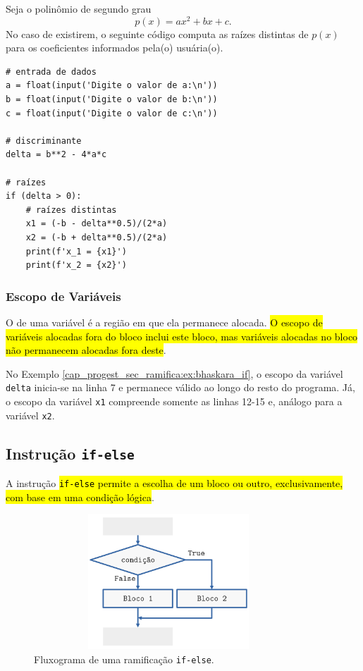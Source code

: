\begin{ex}\label{cap_progest_sec_ramifica:ex:bhaskara_if}
  Seja o polinômio de segundo grau
  \begin{equation}
    p(x) = ax^2 + bx + c.
  \end{equation}
  No caso de existirem, o seguinte código computa as raízes distintas de $p(x)$ para os coeficientes informados pela(o) usuária(o).

\begin{lstlisting}
# entrada de dados
a = float(input('Digite o valor de a:\n'))
b = float(input('Digite o valor de b:\n'))
c = float(input('Digite o valor de c:\n'))

# discriminante
delta = b**2 - 4*a*c

# raízes
if (delta > 0):
    # raízes distintas
    x1 = (-b - delta**0.5)/(2*a)
    x2 = (-b + delta**0.5)/(2*a)
    print(f'x_1 = {x1}')
    print(f'x_2 = {x2}')
\end{lstlisting}

\end{ex}

\subsubsection{Escopo de Variáveis}

O  de uma variável é a região em que ela permanece alocada. \hl{O escopo de variáveis alocadas fora do bloco {\PYTHONif} inclui este bloco, mas variáveis alocadas no bloco {\PYTHONif} não permanecem alocadas fora deste}.

\begin{ex}
  No Exemplo \ref{cap_progest_sec_ramifica:ex:bhaskara_if}, o escopo da variável \lstinline+delta+ inicia-se na linha 7 e permanece válido ao longo do resto do programa. Já, o escopo da variável \lstinline+x1+ compreende somente as linhas 12-15 e, análogo para a variável \lstinline+x2+. 
\end{ex}

\subsection{Instrução \texttt{if-else}}

A instrução \hl{\texttt{if-else} permite a escolha de um bloco ou outro, exclusivamente, com base em uma condição lógica}.

\begin{figure}[H]
  \centering
  \includegraphics[max width=0.9\textwidth, max height=2in]{./cap_progest/dados/fig_fg_else/fig.png}
  \caption{Fluxograma de uma ramificação \lstinline+if-else+.}
  \label{cap_progest_sec_ramifica:fig:fg_else}
\end{figure}

